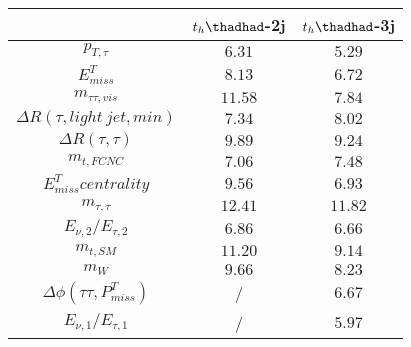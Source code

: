 \centering
\begin{tabular}{|c|c|c|} \hline
  & $t_h\thadhad$-2j & $t_h\thadhad$-3j \\\hline
$p_{T,\tau }$ & $6.31$ & $5.29$\\\hline
$E^{T}_{miss}$ & $8.13$ & $6.72$\\\hline
$m_{\tau \tau ,vis}$ & $11.58$ & $7.84$\\\hline
$\Delta R(\tau ,light~jet,min)$ & $7.34$ & $8.02$\\\hline
$\Delta R(\tau ,\tau )$ & $9.89$ & $9.24$\\\hline
$m_{t,FCNC}$ & $7.06$ & $7.48$\\\hline
$E^{T}_{miss} centrality$ & $9.56$ & $6.93$\\\hline
$m_{\tau ,\tau }$ & $12.41$ & $11.82$\\\hline
$E_{\nu,2}/E_{\tau ,2}$ & $6.86$ & $6.66$\\\hline
$m_{t,SM}$ & $11.20$ & $9.14$\\\hline
$m_{W}$ & $9.66$ & $8.23$\\\hline
$\Delta\phi(\tau \tau ,P^{T}_{miss})$ &  / & $6.67$\\\hline
$E_{\nu,1}/E_{\tau ,1}$ &  / & $5.97$\\\hline
\end{tabular}
